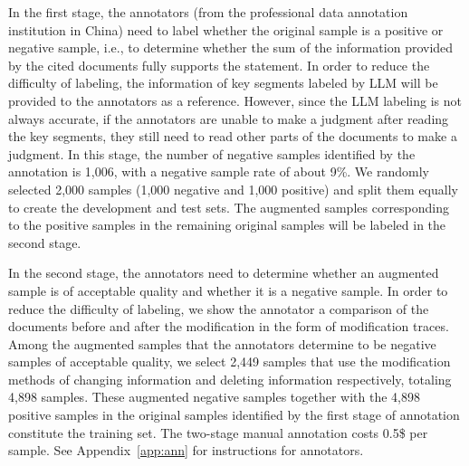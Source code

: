 In the first stage, the annotators (from the professional data annotation institution in China) need to label whether the original sample is a positive or negative sample, i.e., to determine whether the sum of the information provided by the cited documents fully supports the statement. In order to reduce the difficulty of labeling, the information of key segments labeled by LLM will be provided to the annotators as a reference. However, since the LLM labeling is not always accurate, if the annotators are unable to make a judgment after reading the key segments, they still need to read other parts of the documents to make a judgment. 
In this stage, the number of negative samples identified by the annotation is 1,006, with a negative sample rate of about 9\%. We randomly selected 2,000 samples (1,000 negative and 1,000 positive) and split them equally to create the development and test sets. The augmented samples corresponding to the positive samples in the remaining original samples will be labeled in the second stage.

In the second stage, the annotators need to determine whether an augmented sample is of acceptable quality and whether it is a negative sample. In order to reduce the difficulty of labeling, we show the annotator a comparison of the documents before and after the modification in the form of modification traces. Among the augmented samples that the annotators determine to be negative samples of acceptable quality, we select 2,449 samples that use the modification methods of changing information and deleting information respectively, totaling 4,898 samples. These augmented negative samples together with the 4,898 positive samples in the original samples identified by the first stage of annotation constitute the training set. The two-stage manual annotation costs 0.5\$ per sample. See Appendix~\ref{app:ann} for instructions for annotators.
